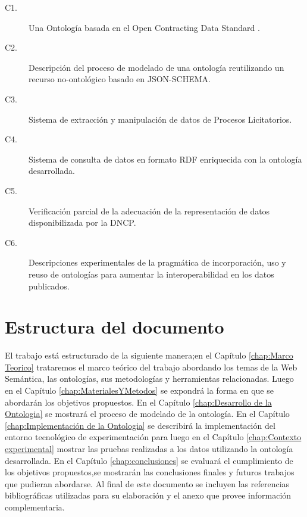 \begin{description}
    \item[C1.] \label{contrib:1}Una Ontología basada en el Open Contracting Data Standard \cite{OCDSReleaseSchema:online}.
    \item[C2.] \label{contrib:2}Descripción del proceso de modelado de una ontología reutilizando un recurso no-ontológico basado en JSON-SCHEMA\cite {JSONSche10:online}.
    \item[C3.] \label{contrib:3}Sistema de extracción y manipulación de datos de Procesos Licitatorios.
    \item[C4.] \label{contrib:4}Sistema de consulta de datos en formato RDF enriquecida con la ontología desarrollada.
    \item[C5.] \label{contrib:6}Verificación parcial de la adecuación de la representación de datos disponibilizada por la DNCP.
    \item[C6.] \label{contrib:5}Descripciones experimentales de la pragmática de incorporación, uso y reuso de ontologías para aumentar la interoperabilidad en los datos publicados.
\end{description} 
 

\section{Estructura del documento}
El trabajo está estructurado de la siguiente manera;en el  Capítulo \ref{chap:Marco Teorico} trataremos el marco teórico del trabajo abordando los temas de la Web Semántica, las ontologías, sus metodologías y herramientas relacionadas. Luego en el Capítulo \ref{chap:MaterialesYMetodos} se expondrá la forma en que se abordarán los objetivos propuestos. En el Capítulo \ref{chap:Desarrollo de la Ontologia} se mostrará el proceso de modelado de la ontología. En el Capítulo \ref{chap:Implementación de la Ontologia} se describirá la implementación del entorno tecnológico de experimentación para luego en el Capítulo \ref{chap:Contexto experimental} mostrar las pruebas realizadas a los datos utilizando la ontología desarrollada. En el Capítulo \ref{chap:conclusiones} se evaluará el cumplimiento de los objetivos propuestos,se mostrarán las conclusiones finales y futuros trabajos que pudieran abordarse. Al final de este documento  se  incluyen las referencias bibliográficas utilizadas para su elaboración y el anexo que provee información complementaria.


